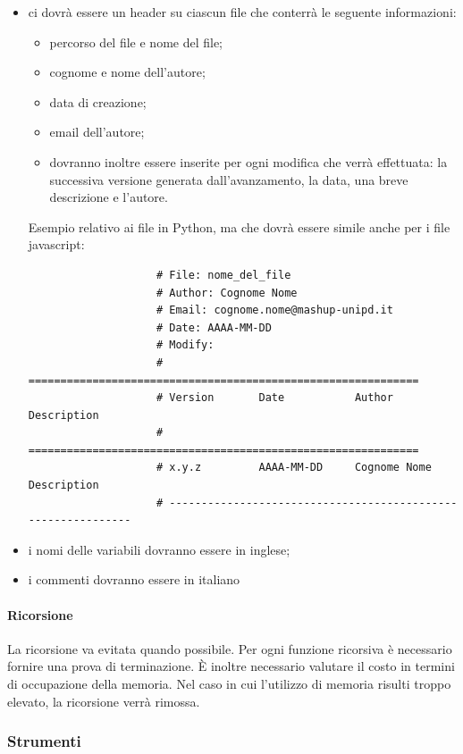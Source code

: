 				\begin{itemize}
					\item ci dovrà essere un header su ciascun file che conterrà le seguente informazioni:
						\begin{itemize}
							\item percorso del file e nome del file;
							\item cognome e nome dell'autore;
							\item data di creazione;
							\item email dell'autore;
							\item dovranno inoltre essere inserite per ogni modifica che verrà effettuata: la successiva versione generata dall'avanzamento, la data, una breve descrizione e l'autore.
						\end{itemize}
					\noindent
					Esempio relativo ai file in Python, ma che dovrà essere simile anche per i file javascript:
					\begin{verbatim}
					# File: nome_del_file
					# Author: Cognome Nome
					# Email: cognome.nome@mashup-unipd.it
					# Date: AAAA-MM-DD
					# Modify:
					# =============================================================
					# Version       Date           Author              Description  
					# =============================================================
					# x.y.z         AAAA-MM-DD     Cognome Nome        Description
					# -------------------------------------------------------------
					\end{verbatim}

					\item i nomi delle variabili dovranno essere in inglese;
					\item i commenti dovranno essere in italiano
				\end{itemize}

			\paragraph{Ricorsione} %
			\label{par:ricorsione}
			La ricorsione va evitata quando possibile. Per ogni funzione ricorsiva è necessario fornire una prova di terminazione. È inoltre necessario valutare il costo in termini di occupazione della memoria. Nel caso in cui l’utilizzo di memoria risulti troppo elevato, la ricorsione verrà rimossa.

		\subsubsection{Strumenti}

